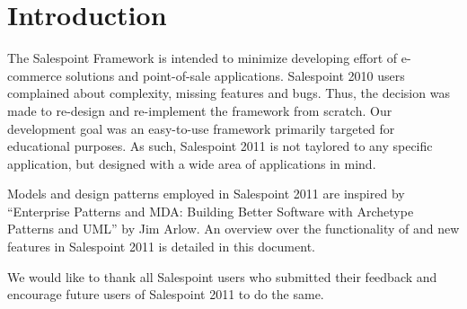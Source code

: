 \chapter{Introduction}
The Salespoint Framework is intended to minimize developing effort of e-commerce solutions and point-of-sale applications.
Salespoint 2010 users complained about complexity, missing features and bugs.
Thus, the decision was made to re-design and re-implement the framework from scratch.
Our development goal was an easy-to-use framework primarily targeted for educational purposes.
As such, Salespoint 2011 is not taylored to any specific application, but designed with a wide area of applications in mind.

Models and design patterns employed in Salespoint 2011 are inspired by ``Enterprise Patterns and MDA: Building Better Software with Archetype Patterns and UML'' \cite{MDA} by Jim Arlow.
An overview over the functionality of and new features in Salespoint 2011 is detailed in this document.

We would like to thank all Salespoint users who submitted their feedback and encourage future users of Salespoint 2011 to do the same.
